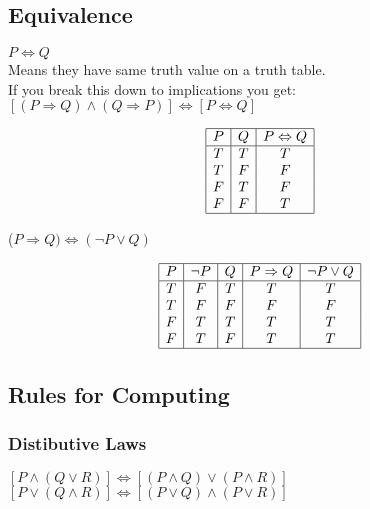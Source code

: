 \documentclass[a4paper]{article}
\begin{document}
\subsection{Equivalence}
$P \Leftrightarrow Q$	
\\
Means they have same truth value on a truth table.
\\
If you break this down to implications you get:
\\
$[(P \Rightarrow Q) \land (Q \Rightarrow P)] \Leftrightarrow [P \Leftrightarrow Q]$
\begin{center}
	\begin{displaymath}
		\begin{array}{|c|c|c|}
			\hline
			P & Q & P \Leftrightarrow Q \\ 
			\hline
			T & T & T\\
			T & F & F\\
			F & T & F\\
			F & F & T\\
			\hline
		\end{array}
	\end{displaymath}
\end{center}


($P \Rightarrow Q) \Leftrightarrow (\lnot P \lor Q)$ 
\begin{center}
	\begin{displaymath}
		\begin{array}{|c|c|c|c|c|}
			\hline
			P & \lnot P & Q & P \Rightarrow Q & \lnot P \lor Q\\ 
			\hline
			T & F & T & T & T\\
			T & F & F & F & F\\
			F & T & T & T & T\\
			F & T & F & T & T\\
			\hline
		\end{array}
	\end{displaymath}
\end{center}

\subsection{Rules for Computing}

\subsubsection{Distibutive Laws}
$[P \land (Q \lor R)]\Leftrightarrow[(P \land Q) \lor (P \land R)]$\\
$[P \lor (Q \land R)]\Leftrightarrow[(P \lor Q) \land (P \lor R)]$
\end{document}
